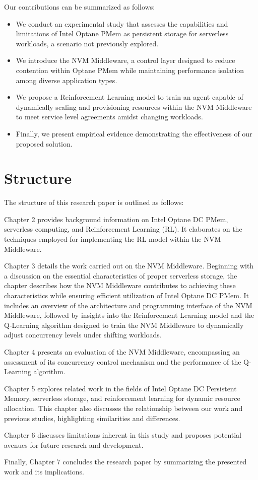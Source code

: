 Our contributions can be summarized as follows:

\begin{itemize}
    \item We conduct an experimental study that assesses the capabilities and limitations of Intel Optane PMem as persistent storage for serverless workloads, a scenario not previously explored.
    \item We introduce the NVM Middleware, a control layer designed to reduce contention within Optane PMem while maintaining performance isolation among diverse application types.
    \item We propose a Reinforcement Learning model to train an agent capable of dynamically scaling and provisioning resources within the NVM Middleware to meet service level agreements amidst changing workloads.
    \item Finally, we present empirical evidence demonstrating the effectiveness of our proposed solution.
\end{itemize}

\section{Structure}

The structure of this research paper is outlined as follows:

Chapter 2 provides background information on Intel Optane DC PMem, serverless computing, and Reinforcement Learning (RL). It elaborates on the techniques employed for implementing the RL model within the NVM Middleware.

Chapter 3 details the work carried out on the NVM Middleware. Beginning with a discussion on the essential characteristics of proper serverless storage, the chapter describes how the NVM Middleware contributes to achieving these characteristics while ensuring efficient utilization of Intel Optane DC PMem. It includes an overview of the architecture and programming interface of the NVM Middleware, followed by insights into the Reinforcement Learning model and the Q-Learning algorithm designed to train the NVM Middleware to dynamically adjust concurrency levels under shifting workloads.

Chapter 4 presents an evaluation of the NVM Middleware, encompassing an assessment of its concurrency control mechanism and the performance of the Q-Learning algorithm.

Chapter 5 explores related work in the fields of Intel Optane DC Persistent Memory, serverless storage, and reinforcement learning for dynamic resource allocation. This chapter also discusses the relationship between our work and previous studies, highlighting similarities and differences.

Chapter 6 discusses limitations inherent in this study and proposes potential avenues for future research and development.

Finally, Chapter 7 concludes the research paper by summarizing the presented work and its implications.